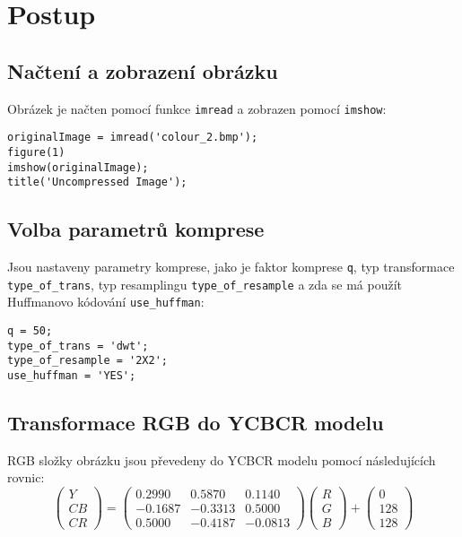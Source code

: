 \section*{Postup}

\subsection*{Načtení a zobrazení obrázku}
Obrázek je načten pomocí funkce \texttt{imread} a zobrazen pomocí \texttt{imshow}:
\begin{verbatim}
originalImage = imread('colour_2.bmp');
figure(1)
imshow(originalImage);
title('Uncompressed Image');
\end{verbatim}

\subsection*{Volba parametrů komprese}
Jsou nastaveny parametry komprese, jako je faktor komprese \texttt{q}, typ transformace \texttt{type\_of\_trans}, typ resamplingu \texttt{type\_of\_resample} a zda se má použít Huffmanovo kódování \texttt{use\_huffman}:
\begin{verbatim}
q = 50;
type_of_trans = 'dwt';
type_of_resample = '2X2';
use_huffman = 'YES';
\end{verbatim}

\subsection*{Transformace RGB do YCBCR modelu}
RGB složky obrázku jsou převedeny do YCBCR modelu pomocí následujících rovnic\cite{pIDhmNtdwMgbcGoe}\cite{ygeiGeoinf2}:
\[
\begin{pmatrix}
Y \\
CB \\
CR
\end{pmatrix}
=
\begin{pmatrix}
0.2990 & 0.5870 & 0.1140 \\
-0.1687 & -0.3313 & 0.5000 \\
0.5000 & -0.4187 & -0.0813
\end{pmatrix}
\begin{pmatrix}
R \\
G \\
B
\end{pmatrix}
+
\begin{pmatrix}
0 \\
128 \\
128
\end{pmatrix}
\]


